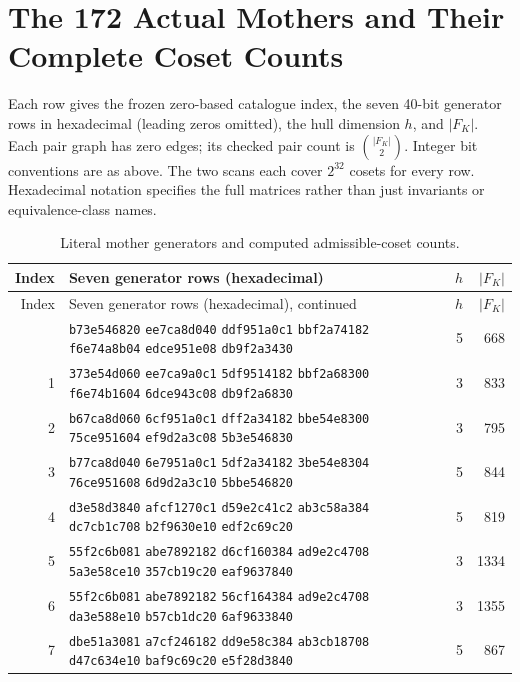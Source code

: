 \section{The 172 Actual Mothers and Their Complete Coset Counts}
\label{app:catalogue}
Each row gives the frozen zero-based catalogue index, the seven 40-bit generator rows in hexadecimal (leading zeros omitted), the hull dimension $h$, and $|F_K|$. Each pair graph has zero edges; its checked pair count is $\binom{|F_K|}{2}$. Integer bit conventions are as above. The two scans each cover $2^{32}$ cosets for every row. Hexadecimal notation specifies the full matrices rather than just invariants or equivalence-class names.
\begingroup\small
\begin{longtable}{@{}r p{12cm} r r@{}}
\caption{Literal mother generators and computed admissible-coset counts.}\\
\toprule
Index & Seven generator rows (hexadecimal) & $h$ & $|F_K|$\\
\midrule\endfirsthead
\toprule Index & Seven generator rows (hexadecimal), continued & $h$ & $|F_K|$\\\midrule\endhead
\bottomrule\endfoot
0 & \texttt{b73e546820} \texttt{ee7ca8d040} \texttt{ddf951a0c1} \texttt{bbf2a74182} \texttt{f6e74a8b04} \texttt{edce951e08} \texttt{db9f2a3430} & 5 & 668 \\
1 & \texttt{373e54d060} \texttt{ee7ca9a0c1} \texttt{5df9514182} \texttt{bbf2a68300} \texttt{f6e74b1604} \texttt{6dce943c08} \texttt{db9f2a6830} & 3 & 833 \\
2 & \texttt{b67ca8d060} \texttt{6cf951a0c1} \texttt{dff2a34182} \texttt{bbe54e8300} \texttt{75ce951604} \texttt{ef9d2a3c08} \texttt{5b3e546830} & 3 & 795 \\
3 & \texttt{b77ca8d040} \texttt{6e7951a0c1} \texttt{5df2a34182} \texttt{3be54e8304} \texttt{76ce951608} \texttt{6d9d2a3c10} \texttt{5bbe546820} & 5 & 844 \\
4 & \texttt{d3e58d3840} \texttt{afcf1270c1} \texttt{d59e2c41c2} \texttt{ab3c58a384} \texttt{dc7cb1c708} \texttt{b2f9630e10} \texttt{edf2c69c20} & 5 & 819 \\
5 & \texttt{55f2c6b081} \texttt{abe7892182} \texttt{d6cf160384} \texttt{ad9e2c4708} \texttt{5a3e58ce10} \texttt{357cb19c20} \texttt{eaf9637840} & 3 & 1334 \\
6 & \texttt{55f2c6b081} \texttt{abe7892182} \texttt{56cf164384} \texttt{ad9e2c4708} \texttt{da3e588e10} \texttt{b57cb1dc20} \texttt{6af9633840} & 3 & 1355 \\
7 & \texttt{dbe51a3081} \texttt{a7cf246182} \texttt{dd9e58c384} \texttt{ab3cb18708} \texttt{d47c634e10} \texttt{baf9c69c20} \texttt{e5f28d3840} & 5 & 867 \\

\end{longtable}
